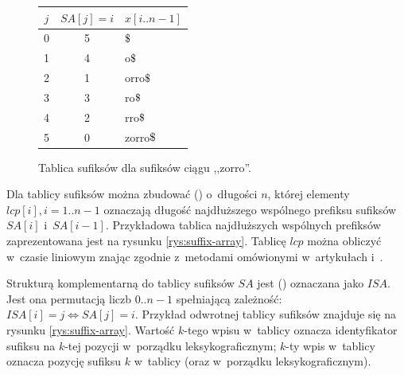 \begin{figure}[t]
    \begin{center}
        \begin{tabular}{ c c l }
            \toprule
            $j$ & $\textit{SA}[j]=i$ & $x[i..n-1]$ \\
            \midrule
            0 & 5 &        $\dollar$ \\
            1 & 4 &        o$\dollar$ \\
            2 & 1 &        orro$\dollar$ \\
            3 & 3 &        ro$\dollar$ \\
            4 & 2 &        rro$\dollar$ \\
            5 & 0 &        zorro$\dollar$ \\
            \bottomrule
        \end{tabular}
    \end{center}
\caption{Tablica sufiksów dla sufiksów ciągu ,,zorro\dollar''.}%
\label{rys:suffix-array-vis}
\end{figure}

Dla tablicy sufiksów można zbudować 
() \cite{taxonomy} o~długości $n$, której elementy
$\textit{lcp}[i], i = 1..n-1$ oznaczają długość najdłuższego wspólnego prefiksu sufiksów
$\textit{SA}[i]$ i~$\mathit{SA}[i-1]$. Przykładowa tablica najdłuższych wspólnych prefiksów
zaprezentowana jest na rysunku \ref{rys:suffix-array}. Tablicę $\textit{lcp}$ można obliczyć
w~czasie liniowym znając \SA{} zgodnie z~metodami omówionymi w~artykułach \cite{lcp-kasai}
i~\cite{lcp-manzini}.

Strukturą komplementarną do tablicy sufiksów $\textit{SA}$ jest  () \cite{taxonomy} oznaczana jako $\textit{ISA}$. Jest ona
permutacją liczb $0..n-1$ spełniającą zależność: $\textit{ISA}[i] = j \iff \textit{SA}[j] = i$.
Przykład odwrotnej tablicy sufiksów znajduje się na rysunku \ref{rys:suffix-array}. Wartość $k$-tego
wpisu w~tablicy \SA{} oznacza identyfikator sufiksu na $k$-tej pozycji w~porządku leksykograficznym;
$k$-ty wpis w~tablicy \ISA{} oznacza pozycję sufiksu $k$ w~tablicy \SA{} (oraz w~porządku
leksykograficznym).

